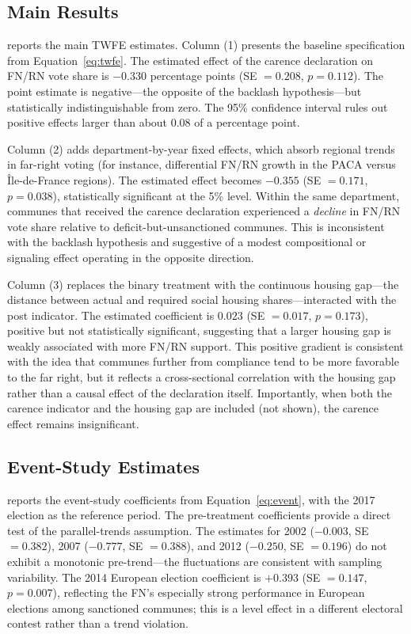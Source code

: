 \documentclass[12pt]{article}
\begin{document}
\subsection{Main Results}

 reports the main TWFE estimates. Column (1) presents the baseline specification from Equation~\eqref{eq:twfe}. The estimated effect of the carence declaration on FN/RN vote share is $-0.330$ percentage points (SE $= 0.208$, $p = 0.112$). The point estimate is negative---the opposite of the backlash hypothesis---but statistically indistinguishable from zero. The 95\% confidence interval rules out positive effects larger than about 0.08 of a percentage point.

Column (2) adds department-by-year fixed effects, which absorb regional trends in far-right voting (for instance, differential FN/RN growth in the PACA versus \^{I}le-de-France regions). The estimated effect becomes $-0.355$ (SE $= 0.171$, $p = 0.038$), statistically significant at the 5\% level. Within the same department, communes that received the carence declaration experienced a \textit{decline} in FN/RN vote share relative to deficit-but-unsanctioned communes. This is inconsistent with the backlash hypothesis and suggestive of a modest compositional or signaling effect operating in the opposite direction.

Column (3) replaces the binary treatment with the continuous housing gap---the distance between actual and required social housing shares---interacted with the post indicator. The estimated coefficient is $0.023$ (SE $= 0.017$, $p = 0.173$), positive but not statistically significant, suggesting that a larger housing gap is weakly associated with more FN/RN support. This positive gradient is consistent with the idea that communes further from compliance tend to be more favorable to the far right, but it reflects a cross-sectional correlation with the housing gap rather than a causal effect of the declaration itself. Importantly, when both the carence indicator and the housing gap are included (not shown), the carence effect remains insignificant.



\subsection{Event-Study Estimates}

 reports the event-study coefficients from Equation~\eqref{eq:event}, with the 2017 election as the reference period. The pre-treatment coefficients provide a direct test of the parallel-trends assumption. The estimates for 2002 ($-0.003$, SE $= 0.382$), 2007 ($-0.777$, SE $= 0.388$), and 2012 ($-0.250$, SE $= 0.196$) do not exhibit a monotonic pre-trend---the fluctuations are consistent with sampling variability. The 2014 European election coefficient is $+0.393$ (SE $= 0.147$, $p = 0.007$), reflecting the FN's especially strong performance in European elections among sanctioned communes; this is a level effect in a different electoral contest rather than a trend violation.
\end{document}
